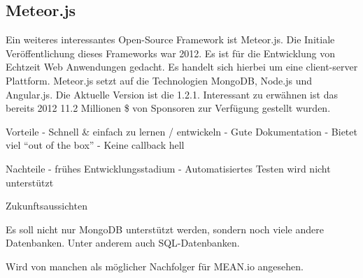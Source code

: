 \subsection{Meteor.js}\label{meteor.js}

Ein weiteres interessantes Open-Source Framework ist Meteor.js. Die
Initiale Veröffentlichung dieses Frameworks war 2012. Es ist für die
Entwicklung von Echtzeit Web Anwendungen gedacht. Es handelt sich
hierbei um eine client-server Plattform. Meteor.js setzt auf die
Technologien MongoDB, Node.js und Angular.js. Die Aktuelle Version ist
die 1.2.1. Interessant zu erwähnen ist das bereits 2012 11.2 Millionen
\$ von Sponsoren zur Verfügung gestellt wurden.

Vorteile - Schnell \& einfach zu lernen / entwickeln - Gute
Dokumentation - Bietet viel ``out of the box'' - Keine callback hell

Nachteile - frühes Entwicklungsstadium - Automatisiertes Testen wird
nicht unterstützt

Zukunftsaussichten

Es soll nicht nur MongoDB unterstützt werden, sondern noch viele andere
Datenbanken. Unter anderem auch SQL-Datenbanken.

Wird von manchen als möglicher Nachfolger für MEAN.io angesehen.
